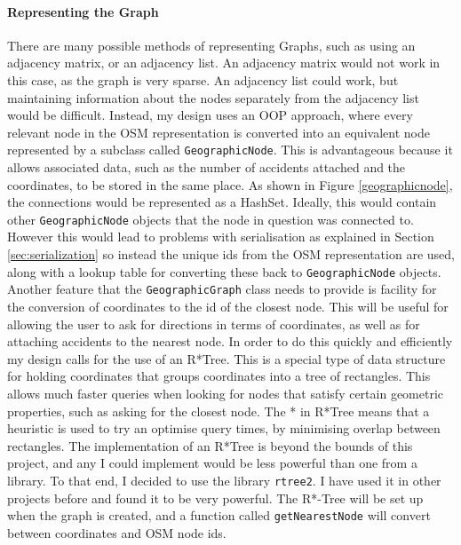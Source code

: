 \documentclass[11pt,twoside,a4paper]{article}
\begin{document}
\paragraph{Representing the Graph}
\label{Rtree}
There are many possible methods of representing Graphs, such as using an adjacency matrix, or an adjacency list. An adjacency matrix would not work in this case, as the graph is very sparse. An adjacency list could work, but maintaining information about the nodes 
separately from the adjacency list would be difficult. Instead, my design uses an OOP approach, where every relevant node in the OSM representation is converted into an equivalent node represented by a subclass called \texttt{GeographicNode}.
This is advantageous because it allows associated data, such as the number of accidents attached and the coordinates, to be stored in the same place. As shown in Figure \ref{geographicnode}, the connections would be represented as a HashSet. Ideally, this would contain
other \texttt{GeographicNode} objects that the node in question was connected to. However this would lead to problems with serialisation as explained in Section \ref{sec:serialization} so instead the unique ids from the OSM representation are used,
along with a lookup table for converting these back to \texttt{GeographicNode} objects.\\
Another feature that the \texttt{GeographicGraph} class needs to provide is facility for the conversion of coordinates to the id of the closest node. This will be useful for allowing the user to ask for directions in terms of coordinates,
as well as for attaching accidents to the nearest node.
In order to do this quickly and efficiently my design calls for the use of an R*Tree\cite{Beckmann1990}. This is a special type of data structure for holding coordinates that groups coordinates into a tree of rectangles. This allows much faster queries when looking for nodes that satisfy certain geometric properties, such as asking for the closest node.
The * in R*Tree means that a heuristic is used to try an optimise query times, by minimising overlap between rectangles. 
The implementation of an R*Tree is beyond the bounds of this project, and any I could implement would be less powerful than one from a library. To that end, I decided to use the library \texttt{rtree2}\cite{rtree}. I have used it in other projects before and found it to be very powerful. The R*-Tree will be set up when the graph is created, and a 
function called \texttt{getNearestNode} will convert between coordinates and OSM node ids. 
\end{document}
